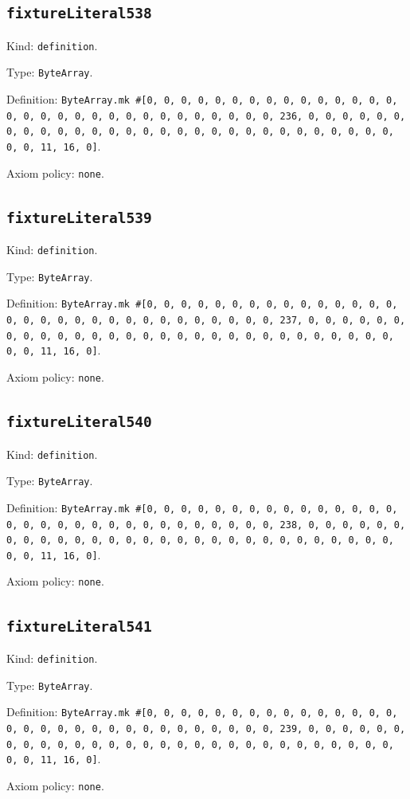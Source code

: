 \documentclass[11pt]{article}
\begin{document}
\subsection*{\texttt{fixtureLiteral538}}
\noindent Kind: \texttt{definition}.\par
\noindent Type: \texttt{ByteArray}.\par
\noindent Definition: \texttt{ByteArray.mk \#[0, 0, 0, 0, 0, 0, 0, 0, 0, 0, 0, 0, 0, 0, 0, 0, 0, 0, 0, 0, 0, 0, 0, 0, 0, 0, 0, 0, 0, 0, 0, 236, 0, 0, 0, 0, 0, 0, 0, 0, 0, 0, 0, 0, 0, 0, 0, 0, 0, 0, 0, 0, 0, 0, 0, 0, 0, 0, 0, 0, 0, 0, 0, 11, 16, 0]}.\par
\noindent Axiom policy: \texttt{none}.\par
\subsection*{\texttt{fixtureLiteral539}}
\noindent Kind: \texttt{definition}.\par
\noindent Type: \texttt{ByteArray}.\par
\noindent Definition: \texttt{ByteArray.mk \#[0, 0, 0, 0, 0, 0, 0, 0, 0, 0, 0, 0, 0, 0, 0, 0, 0, 0, 0, 0, 0, 0, 0, 0, 0, 0, 0, 0, 0, 0, 0, 237, 0, 0, 0, 0, 0, 0, 0, 0, 0, 0, 0, 0, 0, 0, 0, 0, 0, 0, 0, 0, 0, 0, 0, 0, 0, 0, 0, 0, 0, 0, 0, 11, 16, 0]}.\par
\noindent Axiom policy: \texttt{none}.\par
\subsection*{\texttt{fixtureLiteral540}}
\noindent Kind: \texttt{definition}.\par
\noindent Type: \texttt{ByteArray}.\par
\noindent Definition: \texttt{ByteArray.mk \#[0, 0, 0, 0, 0, 0, 0, 0, 0, 0, 0, 0, 0, 0, 0, 0, 0, 0, 0, 0, 0, 0, 0, 0, 0, 0, 0, 0, 0, 0, 0, 238, 0, 0, 0, 0, 0, 0, 0, 0, 0, 0, 0, 0, 0, 0, 0, 0, 0, 0, 0, 0, 0, 0, 0, 0, 0, 0, 0, 0, 0, 0, 0, 11, 16, 0]}.\par
\noindent Axiom policy: \texttt{none}.\par
\subsection*{\texttt{fixtureLiteral541}}
\noindent Kind: \texttt{definition}.\par
\noindent Type: \texttt{ByteArray}.\par
\noindent Definition: \texttt{ByteArray.mk \#[0, 0, 0, 0, 0, 0, 0, 0, 0, 0, 0, 0, 0, 0, 0, 0, 0, 0, 0, 0, 0, 0, 0, 0, 0, 0, 0, 0, 0, 0, 0, 239, 0, 0, 0, 0, 0, 0, 0, 0, 0, 0, 0, 0, 0, 0, 0, 0, 0, 0, 0, 0, 0, 0, 0, 0, 0, 0, 0, 0, 0, 0, 0, 11, 16, 0]}.\par
\noindent Axiom policy: \texttt{none}.\par
\end{document}
